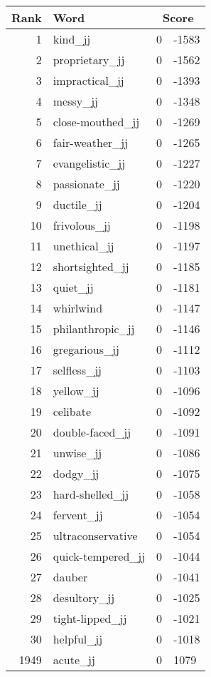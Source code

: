 \begin{longtable}[!htbp]{| rlr@{.}l |}
    \hline
    \textbf{Rank} & \textbf{Word} & \multicolumn{2}{c|}{\textbf{Score}} \\
    \hline
    \endhead
    1 & kind\_jj & 0 & -1583 \\
    2 & proprietary\_jj & 0 & -1562 \\
    3 & impractical\_jj & 0 & -1393 \\
    4 & messy\_jj & 0 & -1348 \\
    5 & close-mouthed\_jj & 0 & -1269 \\
    6 & fair-weather\_jj & 0 & -1265 \\
    7 & evangelistic\_jj & 0 & -1227 \\
    8 & passionate\_jj & 0 & -1220 \\
    9 & ductile\_jj & 0 & -1204 \\
    10 & frivolous\_jj & 0 & -1198 \\
    11 & unethical\_jj & 0 & -1197 \\
    12 & shortsighted\_jj & 0 & -1185 \\
    13 & quiet\_jj & 0 & -1181 \\
    14 & whirlwind & 0 & -1147 \\
    15 & philanthropic\_jj & 0 & -1146 \\
    16 & gregarious\_jj & 0 & -1112 \\
    17 & selfless\_jj & 0 & -1103 \\
    18 & yellow\_jj & 0 & -1096 \\
    19 & celibate & 0 & -1092 \\
    20 & double-faced\_jj & 0 & -1091 \\
    21 & unwise\_jj & 0 & -1086 \\
    22 & dodgy\_jj & 0 & -1075 \\
    23 & hard-shelled\_jj & 0 & -1058 \\
    24 & fervent\_jj & 0 & -1054 \\
    25 & ultraconservative & 0 & -1054 \\
    26 & quick-tempered\_jj & 0 & -1044 \\
    27 & dauber & 0 & -1041 \\
    28 & desultory\_jj & 0 & -1025 \\
    29 & tight-lipped\_jj & 0 & -1021 \\
    30 & helpful\_jj & 0 & -1018 \\
    1949 & acute\_jj & 0 & 1079 \\

\end{longtable}
